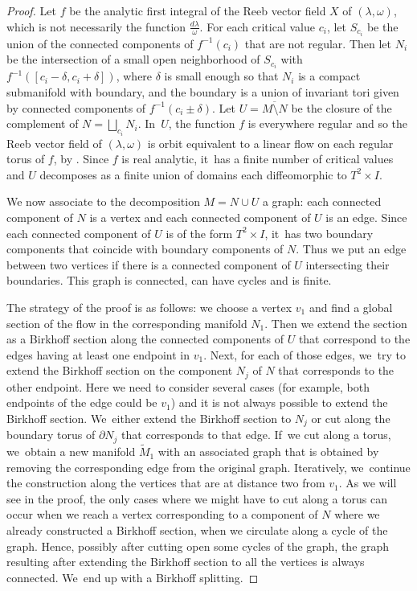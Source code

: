 \documentclass[JEP,XML,SOM,Unicode,NoEqCountersInSection,NoFloatCountersInSection,published]{cedram}
\theoremstyle{definition}
\begin{document}
\begin{proof}
Let $f$ be the analytic first integral of the Reeb vector field $X$ of $(\lambda, \omega)$, which is not necessarily the function $\frac{d\lambda}{\omega}$. For each critical value $c_i$, let $S_{c_i}$ be the union of the connected components of $f^{-1}(c_i)$ that are not regular. Then let $N_i$ be the intersection of a small open neighborhood of $S_{c_i}$ with $f^{-1}([c_i-\delta,c_i+\delta])$, where $\delta$ is small enough so that $N_i$ is a compact submanifold with boundary, and the boundary is a union of invariant tori given by connected components of $f^{-1}(c_i \pm \delta)$. Let $U=\overline{M\setminus N}$ be the closure of the complement of $N=\bigsqcup_{c_i}N_i$. In~$U$, the function $f$ is everywhere regular and so the Reeb vector field of $(\lambda,\omega)$ is orbit equivalent to a linear flow on each regular torus of $f$, \eg by \cite[Th.\,3.3]{CV1}. Since $f$ is real analytic, it~has a finite number of critical values and $U$ decomposes as a finite union of domains each diffeomorphic to $T^2\times I$.

We now associate to the decomposition $M=N\cup U$ a graph: each connected component of $N$ is a vertex and each connected component of $U$ is an edge. Since each connected component of $U$ is of the form $T^2\times I$, it~has two boundary components that coincide with boundary components of $N$. Thus we put an edge between two vertices if there is a connected component of $U$ intersecting their boundaries. This graph is connected, can have cycles and is finite.

The strategy of the proof is as follows: we choose a vertex $v_1$ and find a global section of the flow in the corresponding manifold $N_1$. Then we extend the section as a Birkhoff section along the connected components of $U$ that correspond to the edges having at least one endpoint in $v_1$. Next, for each of those edges, we~try to extend the Birkhoff section on the component $N_j$ of $N$ that corresponds to the other endpoint. Here we need to consider several cases (for example, both endpoints of the edge could be $v_1$) and it is not always possible to extend the Birkhoff section. We~either extend the Birkhoff section to $N_j$ or cut along the boundary torus of $\partial N_j$ that corresponds to that edge. If~we cut along a torus, we~obtain a new manifold $\widetilde M_1$ with an associated graph that is obtained by removing the corresponding edge from the original graph. Iteratively, we~continue the construction along the vertices that are at distance two from $v_1$. As we will see in the proof, the only cases where we might have to cut along a torus can occur when we reach a vertex corresponding to a component of $N$ where we already constructed a Birkhoff section, \ie when we circulate along a cycle of the graph. Hence, possibly after cutting open some cycles of the graph, the graph resulting after extending the Birkhoff section to all the vertices is always connected. We~end up with a Birkhoff splitting.


\end{proof}
\end{document}
